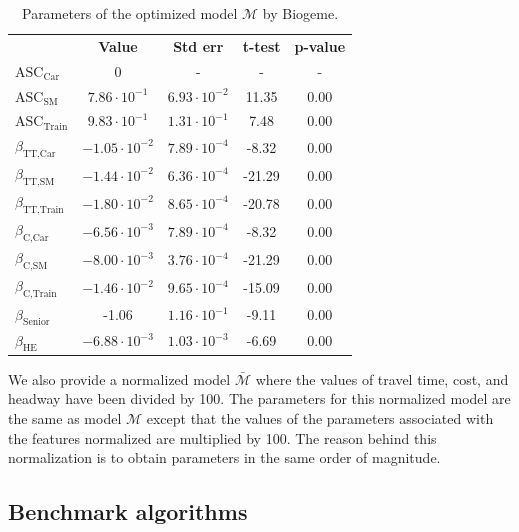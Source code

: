 \documentclass[conference]{IEEEtran}
\newcommand{\E}[1]{\cdot10^{#1}}
\begin{document}
\begin{table}
\vspace{-0.5cm}
\centering
\renewcommand\arraystretch{1.2}
\begin{tabular}{l|cccc}
\multicolumn{1}{l}{} & {\bf Value} & {\bf Std err} & {\bf t-test} & {\bf p-value} \\ \cline{2-5}
$\text{ASC}_{\text{Car}}$ & 0 & - & - & - \\
$\text{ASC}_{\text{SM}}$ & $7.86\E{-1}$ & $6.93\E{-2}$ & 11.35 & 0.00 \\
$\text{ASC}_{\text{Train}}$ & $9.83\E{-1}$ & $1.31\E{-1}$ & 7.48 & 0.00 \\
$\beta_{\text{TT,Car}}$ & $-1.05\E{-2}$ & $7.89\E{-4}$ & -8.32 & 0.00 \\
$\beta_{\text{TT,SM}}$ & $-1.44\E{-2}$ & $6.36\E{-4}$ & -21.29 & 0.00 \\
$\beta_{\text{TT,Train}}$ & $-1.80\E{-2}$ & $8.65\E{-4}$ & -20.78 & 0.00 \\
$\beta_{\text{C,Car}}$ & $-6.56\E{-3}$ & $7.89\E{-4}$ & -8.32 & 0.00 \\
$\beta_{\text{C,SM}}$ & $-8.00\E{-3}$ & $3.76\E{-4}$ & -21.29 & 0.00 \\
$\beta_{\text{C,Train}}$ & $-1.46\E{-2}$ & $9.65\E{-4}$ & -15.09 & 0.00 \\
$\beta_{\text{Senior}}$ & -1.06 & $1.16\E{-1}$ & -9.11 & 0.00 \\
$\beta_{\text{HE}}$ & $-6.88\E{-3}$ & $1.03\E{-3}$ & -6.69 & 0.00
\end{tabular}
\caption{\label{tab:res_biogeme} Parameters of the optimized model $\mathcal{M}$ by Biogeme.}
\vspace{-0.8cm}
\end{table}

We also provide a normalized model $\bar{\mathcal{M}}$ where the values of travel time, cost, and headway have been divided by 100. The parameters for this normalized model are the same as model $\mathcal{M}$ except that the values of the parameters associated with the features normalized are multiplied by 100. The reason behind this normalization is to obtain parameters in the same order of magnitude. \\

\subsection{Benchmark algorithms}
\label{sec:algorithms}
\end{document}
